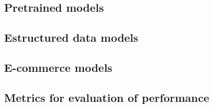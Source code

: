 
\subsection*{Pretrained models}

\subsection*{Estructured data models}

\subsection*{E-commerce models}

\subsection*{Metrics for evaluation of performance}